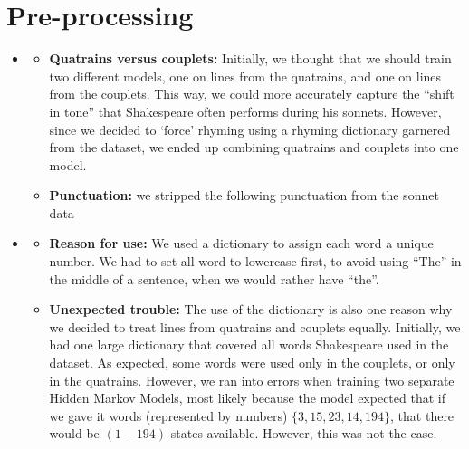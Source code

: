 \section{Pre-processing}
\medskip
\begin{itemize}

    \item {}
    \begin{itemize}
        \item \textbf{Quatrains versus couplets:} Initially, we thought that we should train two different models, one on lines from the quatrains, and one on lines from the couplets. This way, we could more accurately capture the ``shift in tone'' that Shakespeare often performs during his sonnets. However, since we decided to `force' rhyming using a rhyming dictionary garnered from the dataset, we ended up combining quatrains and couplets into one model.
        \item \textbf{Punctuation:} we stripped the following punctuation from the sonnet data
    \end{itemize}
    \item {}
    \begin{itemize}
        \item \textbf{Reason for use:} We used a dictionary to assign each word a unique number. We had to set all word to lowercase first, to avoid using ``The'' in the middle of a sentence, when we would rather have ``the''. 
        \item \textbf{Unexpected trouble:} The use of the dictionary is also one reason why we decided to treat lines from quatrains and couplets equally. Initially, we had one large dictionary that covered all words Shakespeare used in the dataset. As expected, some words were used only in the couplets, or only in the quatrains. However, we ran into errors when training two separate Hidden Markov Models, most likely because the model expected that if we gave it words (represented by numbers) $\{ 3, 15, 23, 14, 194\}$, that there would be $(1-194)$ states available. However, this was not the case. 
    \end{itemize}


\end{itemize}


